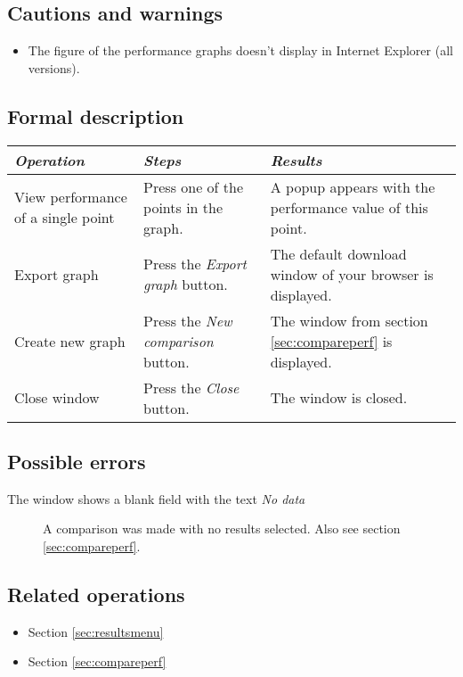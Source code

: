   \subsection*{Cautions and warnings}
  \begin{itemize}
  \item The figure of the performance graphs doesn't display in Internet Explorer (all versions).
  \end{itemize}

  \subsection*{Formal description}
    \begin{tabularx}{\textwidth}{XXX}
    \toprule
    \emph{Operation} & \emph{Steps} & \emph{Results} \\
    \midrule
    View performance of a single point & Press one of the points in the graph. & A popup appears with the performance value of this point. \\
    \midrule
    Export graph & Press the \emph{Export graph} button. & The default download window of your browser is displayed. \\
    \midrule
    Create new graph & Press the \emph{New comparison} button. & The window from section \ref{sec:compareperf} is displayed. \\
    \midrule
    Close window & Press the \emph{Close} button. & The window is closed. \\
    \bottomrule
\end{tabularx}

  \subsection*{Possible errors}
  \begin{description}
  \item[The window shows a blank field with the text \emph{No data}] A comparison was made with no results selected. Also see section \ref{sec:compareperf}.\\
  \end{description}

  \subsection*{Related operations}
   \begin{itemize}
   \item Section \ref{sec:resultsmenu}
   \item Section \ref{sec:compareperf}
  \end{itemize}


